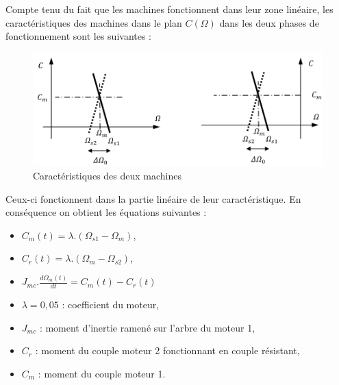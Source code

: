 Compte tenu du fait que les machines fonctionnent dans leur zone linéaire, les caractéristiques des machines dans le plan $C(\Omega)$ dans les deux phases de fonctionnement sont les suivantes :
 
\begin{figure}[!h]
\begin{center}
	\includegraphics[width=0.4\linewidth]{img/fig21}
\end{center}
\caption{Caractéristiques des deux machines}
\label{fig21}
\end{figure}

\newpage

Ceux-ci fonctionnent dans la partie linéaire de leur caractéristique. En conséquence on obtient les équations suivantes :

\begin{minipage}{0.45\linewidth}
\begin{itemize}
 \item $C_m(t)=\lambda.\left(\Omega_{s1}-\Omega_m\right)$,
 \item $C_r(t)=\lambda.(\Omega_m-\Omega_{s2})$,
 \item $J_{mc}.\frac{d\Omega_m(t)}{dt}=C_m(t)-C_r(t)$
\end{itemize}
\end{minipage}
\begin{minipage}{0.45\linewidth}
\begin{itemize}
 \item $\lambda=0,05$ : coefficient du moteur,
 \item $J_{mc}$ : moment d'inertie ramené sur l'arbre du moteur 1,
 \item $C_r$ : moment du couple moteur 2 fonctionnant en couple résistant,
 \item $C_m$ : moment du couple moteur 1.
\end{itemize}
\end{minipage}



